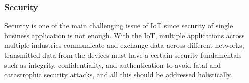 \documentclass[12pt]{article}
\begin{document}
\subsubsection{Security}\label{Sigfox Security}
Security is one of the main challenging issue of IoT since security of single business application is not enough. With the IoT, multiple applications across multiple industries communicate and exchange data across different networks, transmitted data from the devices must have a certain security fundamentals such as integrity, confidentiality, and authentication to avoid fatal and catastrophic security attacks, and  all this should be addressed holistically.\par

\end{document}
